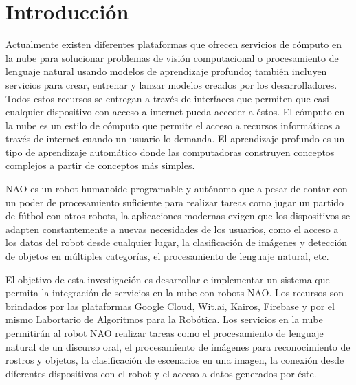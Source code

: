 

\chapter*{Introducción}
\label{\detokenize{introduction:cloudnao-una-arquitectura-de-software-para-la-integracion-de-computo-en-la-nube-con-robots-nao}}\label{\detokenize{introduction:introduccion}}\label{\detokenize{introduction::doc}}
%
Actualmente existen diferentes plataformas que 
ofrecen servicios
de cómputo en la nube para solucionar problemas de 
visión computacional o
procesamiento de lenguaje natural usando modelos
de aprendizaje profundo; también incluyen servicios 
para crear, entrenar y lanzar
modelos creados por los desarrolladores.
Todos estos recursos se entregan a través de 
interfaces que
permiten que casi cualquier dispositivo con acceso a 
internet
pueda acceder a éstos.
El cómputo en la nube es un estilo de cómputo que 
permite el acceso a 
recursos informáticos a través de internet cuando un
usuario lo demanda. El aprendizaje profundo es un 
tipo
de aprendizaje automático donde las computadoras 
construyen
conceptos complejos a partir de conceptos más 
simples.



NAO es un robot humanoide programable y autónomo
que a pesar de contar con
un poder de procesamiento suficiente para realizar 
tareas como
jugar un partido de fútbol con otros robots,
la aplicaciones modernas
exigen que los dispositivos se adapten constantemente a nuevas necesidades
de los usuarios, como el acceso a los datos
del robot desde cualquier lugar, la 
clasificación de imágenes y detección de
objetos en múltiples categorías, el 
procesamiento de lenguaje natural, etc.



El objetivo de esta investigación es desarrollar e implementar un sistema
que permita la integración de servicios en la nube
con robots NAO.
Los recursos son brindados por las plataformas
Google Cloud, Wit.ai, Kairos, Firebase y por
el mismo Labortario de Algoritmos para la
Robótica.
Los servicios en la nube permitirán al robot NAO
realizar tareas como el procesamiento de lenguaje
natural de un discurso oral, el procesamiento 
de imágenes para reconocimiento de rostros
y objetos, la clasificación de escenarios en una
imagen, la conexión desde diferentes dispositivos
con el robot y el acceso a datos generados por
éste.


